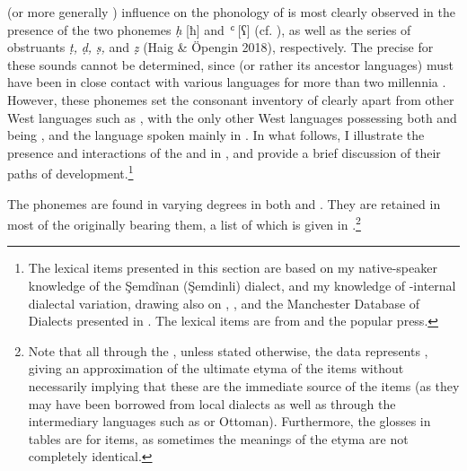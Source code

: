 \documentclass[output=paper]{langsci/langscibook}
\begin{document}
 (or more generally ) influence on the phonology of  is most clearly observed in the presence of the two  phonemes \textit{ḥ} [ħ] and \textit{ʿ} [ʕ] (cf. \citealt{Kahn1976,Haig2007,Anonbyforthcoming,Barryforthcoming}), as well as the series of  obstruants \textit{ṭ,} \textit{ḍ,} \textit{ṣ,} and \textit{ẓ} (Haig \& Öpengin 2018), respectively. The precise   for these sounds cannot be determined, since  (or rather its ancestor languages) must have been in close contact with various  languages for more than two millennia \citep[69]{Utas2005}. However, these phonemes set the consonant inventory of  clearly apart from other West  languages such as , with the only other West  languages possessing both  and  being , and the  language spoken mainly in  \citep{Anonbyforthcoming}. In what follows, I illustrate the presence and interactions of the  and  in , and provide a brief discussion of their paths of development.\footnote{The  lexical items presented in this section are based on my native-speaker knowledge of the Şemdînan (Şemdinli) dialect, and my knowledge of -internal dialectal variation, drawing also on \citep{Chyet2003}, \citep{ÖpenginHaig2014}, and the  Manchester Database of  Dialects presented in \citep{MatrasKoontz-Garboden2016}. The  lexical items are from \citet{Öpengin2016} and the popular press.}  

The  phonemes are found in varying degrees in both   and  . They are retained in most of the   originally bearing them, a list of which is given in .\footnote{Note that all through the , unless stated otherwise, the  data represents  , giving an approximation of the ultimate  etyma of the items without necessarily implying that these are the immediate source of the  items (as they may have been borrowed from local  dialects as well as through the intermediary languages such as  or Ottoman). Furthermore, the glosses in tables are for  items, as sometimes the meanings of the  etyma are not completely identical.} 
\end{document}
